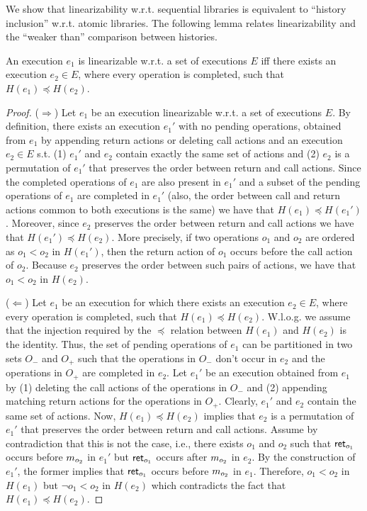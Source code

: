We show that linearizability w.r.t. sequential libraries is equivalent to ``history inclusion'' w.r.t. atomic libraries.
The following lemma relates linearizability and the ``weaker than'' comparison between histories.

\begin{lemma}
  \label{prop:lin}

  An execution $e_1$ is linearizable w.r.t. a set of executions $E$ iff there exists an
  execution $e_2\in E$, where every operation is completed, such that
  $H(e_1)\preceq H(e_2)$.

\end{lemma}

\begin{proof}

($\Rightarrow$) Let $e_1$ be an execution linearizable w.r.t. a set of executions $E$. By definition,
there exists an execution $e_1'$ with no pending operations, obtained from $e_1$ by appending 
return actions or deleting call actions and an execution $e_2\in E$ s.t. (1) $e_1'$ and $e_2$ contain exactly
the same set of actions and (2) $e_2$ is a permutation of $e_1'$ that preserves the order between 
return and call actions. 
Since the completed operations of $e_1$ are also present in $e_1'$ and a subset of the pending operations of $e_1$
are completed in $e_1'$ (also, the order between call and return actions common to both executions is the same)
we have that $H(e_1)\preceq H(e_1')$. Moreover, since $e_2$ preserves the order between return and call actions
we have that $H(e_1')\preceq H(e_2)$. More precisely, if two operations $o_1$ and $o_2$ are ordered as $o_1<o_2$ in $H(e_1')$,
then the return action of $o_1$ occurs before the call action of $o_2$. Because $e_2$ preserves the order between such pairs
of actions, we have that $o_1<o_2$ in $H(e_2)$.

($\Leftarrow$) Let $e_1$ be an execution for which there exists an
  execution $e_2\in E$, where every operation is completed, such that
  $H(e_1)\preceq H(e_2)$. W.l.o.g. we assume that the injection required by the $\preceq$ relation
  between $H(e_1)$ and $H(e_2)$ is the identity.
  Thus, the set of pending operations of $e_1$ can be partitioned in 
  two sets $O_{-}$ and $O_{+}$ such that the operations in $O_{-}$ don't occur in $e_2$ and the operations in 
  $O_{+}$ are completed in $e_2$. Let $e_1'$ be an execution obtained from $e_1$ by 
  (1) deleting the call actions of the operations in $O_{-}$
  and (2) appending matching return actions for the operations in $O_+$. 
  Clearly, $e_1'$ and $e_2$ contain the same set of actions. Now, $H(e_1)\preceq H(e_2)$ implies that 
  $e_2$ is a permutation of $e_1'$ that preserves the order between return and call actions. Assume by contradiction
  that this is not the case, i.e., there exists $o_1$ and $o_2$ such that ${\mathsf{ret}_{o_1}}$ occurs before ${m_{o_2}}$ in $e_1'$ 
  but ${\mathsf{ret}_{o_1}}$ occurs after ${m_{o_2}}$ in $e_2$. By the construction of $e_1'$, the former implies that 
  ${\mathsf{ret}_{o_1}}$ occurs before ${m_{o_2}}$ in $e_1$. Therefore, $o_1<o_2$ in $H(e_1)$ but $\neg o_1<o_2$ in $H(e_2)$
  which contradicts the fact that $H(e_1)\preceq H(e_2)$.
 
\end{proof}

